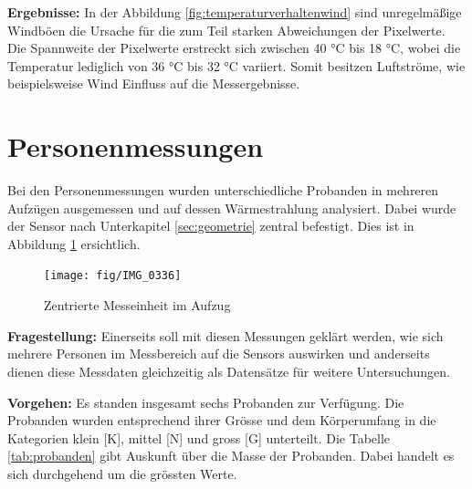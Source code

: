 \textbf{Ergebnisse:} In der Abbildung \ref{fig:temperaturverhaltenwind} sind unregelmäßige Windböen die Ursache für die zum Teil starken Abweichungen der Pixelwerte. Die Spannweite der Pixelwerte erstreckt sich zwischen 40 °C bis 18 °C, wobei die Temperatur lediglich von 36 °C bis 32 °C variiert. Somit besitzen Luftströme, wie beispielsweise Wind Einfluss auf die Messergebnisse. 

\newpage
\section{Personenmessungen}
Bei den Personenmessungen wurden unterschiedliche Probanden in mehreren Aufzügen ausgemessen und auf dessen Wärmestrahlung analysiert. Dabei wurde der Sensor nach Unterkapitel \ref{sec:geometrie} zentral befestigt. Dies ist in Abbildung \ref{fig:img0336} ersichtlich.

\begin{figure}[H]
	\centering
	\texttt{[image: fig/IMG\_0336]}
	\caption[Zentrierte Messeinheit im Aufzug]{Zentrierte Messeinheit im Aufzug}
	\label{fig:img0336}
\end{figure}

\textbf{Fragestellung:} Einerseits soll mit diesen Messungen geklärt werden, wie sich mehrere Personen im Messbereich auf die Sensors auswirken und anderseits dienen diese Messdaten gleichzeitig als Datensätze für weitere Untersuchungen.

\textbf{Vorgehen:} Es standen insgesamt sechs Probanden zur Verfügung. Die Probanden wurden entsprechend ihrer Grösse und dem Körperumfang in die Kategorien klein [K], mittel [N] und gross [G] unterteilt. Die Tabelle \ref{tab:probanden} gibt Auskunft über die Masse der Probanden. Dabei handelt es sich durchgehend um die grössten Werte. 


